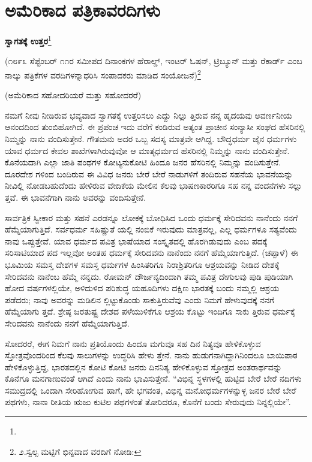 
\chapter{ಅಮೆರಿಕಾದ ಪತ್ರಿಕಾವರದಿಗಳು}

\begin{center}
\textbf{ಸ್ವಾಗತಕ್ಕೆ ಉತ್ತರ}\footnote{}
\end{center}

(೧೮೯೩ ಸೆಪ್ಟೆಂಬರ್ ೧೧ರ ಸಮೀಪದ ದಿನಾಂಕಗಳ ಹೆರಾಲ್ಡ್, ಇಂಟರ್ ಓಷನ್, ಟ್ರಿಬ್ಯೂನ್ ಮತ್ತು ರೆಕಾರ್ಡ್ ಎಂಬ ನಾಲ್ಕು ಪತ್ರಿಕೆಗಳ ವರದಿಗಳನ್ನಾಧರಿಸಿ ಸಂಪಾದಕರು ಮಾಡಿದ ಸಂಯೋಜನೆ)\footnote{೨.ಸ್ವಲ್ಪ ಮಟ್ಟಿಗೆ ಭಿನ್ನವಾದ ವರದಿಗೆ ನೋಡಿ: }

\begin{center}
(ಅಮೆರಿಕಾದ ಸಹೋದರಿಯರೆ ಮತ್ತು ಸಹೋದರರೆ)
\end{center}

ನಮಗೆ ನೀವು ನೀಡಿರುವ ಭವ್ಯವಾದ ಸ್ವಾಗತಕ್ಕೆ ಉತ್ತರಿಸಲು ಎದ್ದು ನಿಲ್ಲು ತ್ತಿರುವ ನನ್ನ ಹೃದಯವು ಅವರ್ಣನೀಯ ಆನಂದದಿಂದ ತುಂಬಿಹೋಗಿದೆ. ಈ ಪ್ರಪಂಚ ಇದು ವರೆಗೆ ಕಂಡಿರುವ ಅತ್ಯಂತ ಪ್ರಾಚೀನ ಸಂನ್ಯಾಸೀ ಸಂಘದ ಹೆಸರಿನಲ್ಲಿ ನಿಮ್ಮನ್ನು ನಾನು ವಂದಿಸುತ್ತೇನೆ. ಗೌತಮನು ಅದರ ಒಬ್ಬ ಸದಸ್ಯ ಮಾತ್ರವೇ ಆಗಿದ್ದ. ಬೌದ್ಧಧರ್ಮ ಜೈನ ಧರ್ಮಗಳು ಯಾವ ಧರ್ಮದ ಕೇವಲ ಶಾಖೆಗಳಾಗಿರುವುವೋ ಆ ಮಾತೃಧರ್ಮದ ಹೆಸರಿನಲ್ಲಿ ನಿಮ್ಮನ್ನು ನಾನು ವಂದಿಸುತ್ತೇನೆ. ಕೊನೆಯದಾಗಿ ಎಲ್ಲಾ ಜಾತಿ ಪಂಥಗಳ ಕೋಟ್ಯನುಕೋಟಿ ಹಿಂದೂ ಜನರ ಹೆಸರಿನಲ್ಲಿ ನಿಮ್ಮನ್ನು ವಂದಿಸುತ್ತೇನೆ. ದೂರದೇಶ ಗಳಿಂದ ಬಂದಿರುವ ಈ ವಿವಿಧ ಜನರು ಬೇರೆ ಬೇರೆ ನಾಡುಗಳಿಗೆ ತಂದಿರುವ ಸಹನೆಯ ಭಾವನೆಯನ್ನು ನೀವಿಲ್ಲಿ ನೋಡಬಹುದೆಂದು ಹೇಳಿರುವ ವೇದಿಕೆಯ ಮೇಲಿನ ಕೆಲವು ಭಾಷಣಕಾರರಿಗೂ ಸಹ ನನ್ನ ವಂದನೆಗಳು ಸಲ್ಲು ತ್ತವೆ. ಈ ಭಾವನೆಗಾಗಿ ನಾನು ಅವರನ್ನು ವಂದಿಸುತ್ತೇನೆ.

ಸಾರ್ವತ್ರಿಕ ಸ್ವೀಕಾರ ಮತ್ತು ಸಹನೆ ಎರಡನ್ನೂ ಲೋಕಕ್ಕೆ ಬೋಧಿಸಿದ ಒಂದು ಧರ್ಮಕ್ಕೆ ಸೇರಿದವನು ನಾನೆಂದು ನನಗೆ ಹೆಮ್ಮೆಯಾಗುತ್ತಿದೆ. ಸರ್ವಧರ್ಮ ಸಹಿಷ್ಣುತೆ ಯಲ್ಲಿ ನಂಬಿಕೆ ಇರುವುದು ಮಾತ್ರವಲ್ಲ, ಎಲ್ಲ ಧರ್ಮಗಳೂ ಸತ್ಯವೆಂದು ನಾವು ಒಪ್ಪುತ್ತೇವೆ. ಯಾವ ಧರ್ಮದ ಪವಿತ್ರ ಭಾಷೆಯಾದ ಸಂಸ್ಕೃತದಲ್ಲಿ ಹೊರಗಿಡುವುದು ಎಂಬ ಪದಕ್ಕೆ ಸರಿಸಾಟಿಯಾದ ಪದ ಇಲ್ಲವೋ ಅಂತಹ ಧರ್ಮಕ್ಕೆ ಸೇರಿದವನು ನಾನೆಂದು ನನಗೆ ಹೆಮ್ಮೆಯಾಗುತ್ತಿದೆ. (ಚಪ್ಪಾಳೆ) ಈ ಭೂಮಿಯ ಸಮಸ್ತ ದೇಶಗಳ ಸಮಸ್ತ ಧರ್ಮಗಳ ಹಿಂಸಿತರಿಗೂ ನಿರಾಶ್ರಿತರಿಗೂ ಆಶ್ರಯವನ್ನು ನೀಡಿದ ದೇಶಕ್ಕೆ ಸೇರಿದವನು ನಾನೆಂಬ ಹೆಮ್ಮೆ ನನ್ನದು. ರೋಮನ್ ದೌರ್ಜನ್ಯದಿಂದಾಗಿ ತಮ್ಮ ಪವಿತ್ರ ದೇಗುಲವು ಪುಡಿ ಪುಡಿಯಾಗಿ ಹೋದ ವರ್ಷಗಳಲ್ಲಿಯೇ, ಅಳಿದುಳಿದ ಪರಿಶುದ್ಧ ಯಹೂದಿಗಳು ದಕ್ಷಿಣ ಭಾರತಕ್ಕೆ ಬಂದು ನಮ್ಮಲ್ಲಿ ಆಶ್ರಯ ಪಡೆದರು; ನಾವು ಅವರನ್ನು ಮಡಿಲಿನ ಲ್ಲಿಟ್ಟುಕೊಂಡು ಸಾಕುತ್ತಿರುವೆವು ಎಂದು ನಿಮಗೆ ಹೇಳುವುದಕ್ಕೆ ನನಗೆ ಹೆಮ್ಮೆಯಾಗು ತ್ತದೆ. ಶ್ರೇಷ್ಠ ಜರತುಷ್ಟ್ರ ದೇಶದ ಪಳೆಯುಳಿಕೆಗೂ ಆಶ್ರಯ ಕೊಟ್ಟು ಇಂದಿಗೂ ಸಾಕು ತ್ತಿರುವ ಧರ್ಮಕ್ಕೆ ಸೇರಿದವನು ನಾನೆಂದು ನನಗೆ ಹೆಮ್ಮೆಯಾಗುತ್ತಿದೆ.

ಸೋದರರೆ, ಈಗ ನಿಮಗೆ ನಾನು ಪ್ರತಿಯೊಂದು ಹಿಂದೂ ಮಗುವೂ ಸಹ ದಿನ ನಿತ್ಯವೂ ಹೇಳಿಕೊಳ್ಳುವ ಸ್ತೋತ್ರವೊಂದರಿಂದ ಕೆಲವು ಸಾಲುಗಳನ್ನು ಉದ್ಧರಿಸಿ ಹೇಳು ತ್ತೇನೆ. ನಾನು ಹುಡುಗನಾಗಿದ್ದಾಗಿನಿಂದಲೂ ಬಾಯಿಪಾಠ ಹೇಳಿಕೊಳ್ಳುತ್ತಿದ್ದ, ಭಾರತದಲ್ಲಿನ ಕೋಟಿ ಕೋಟಿ ಜನರು ದಿನನಿತ್ಯ ಹೇಳಿಕೊಳ್ಳುವ ಸ್ತೋತ್ರದ ಅಂತರಾರ್ಥವನ್ನು ಕೊನೆಗೂ ಮನಗಾಣುವಂತೆ ಆಗಿದೆ ಎಂದು ನಾನು ಭಾವಿಸುತ್ತೇನೆ. “ವಿಭಿನ್ನ ಸ್ಥಳಗಳಲ್ಲಿ ಹುಟ್ಟಿದ ಬೇರೆ ಬೇರೆ ನದಿಗಳು ಸಮುದ್ರದಲ್ಲಿ ಒಂದಾಗಿ ಸೇರಿಹೋಗುವ ಹಾಗೆ, ಹೇ ಭಗವಂತ, ವಿಭಿನ್ನ ಮನೋಧರ್ಮಗಳನ್ನುಳ್ಳ ಜನರ ಬೇರೆ ಬೇರೆ ಪಥಗಳು, ನಾನಾ ರೀತಿಯ ಋಜು ಕುಟಿಲ ಪಥಗಳಂತೆ ತೋರಿದರೂ, ಕೊನೆಗೆ ಬಂದು ಸೇರುವುದು ನಿನ್ನಲ್ಲಿಯೇ”.

